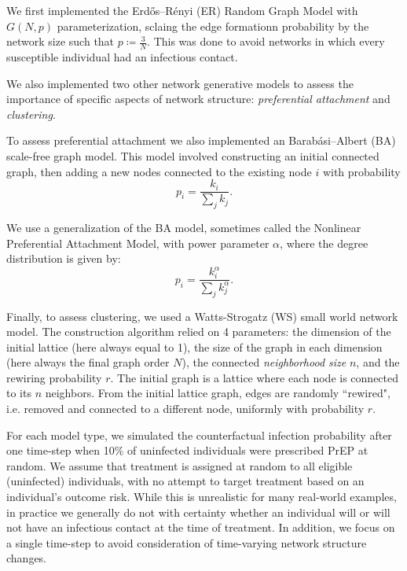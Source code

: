\documentclass{article}
\theoremstyle{definition}
\begin{document}
We first implemented the  Erdős–Rényi (ER) Random Graph Model with $G(N,p)$ parameterization, sclaing the edge formationn probability by the network size such that $p \coloneqq \frac{3}{N}$. This was done to avoid networks in which every susceptible individual had an infectious contact. 

We also implemented two other network generative models to assess the importance of specific aspects of network structure: \textit{preferential attachment} and \textit{clustering}. 

To assess preferential attachment we also implemented an Barabási–Albert (BA) scale-free graph model. This model involved constructing an initial connected graph, then adding a new nodes connected to the existing node $i$ with probability 
\begin{equation*}
    p_{i}=\frac{k_{i}}{\sum_{j}k_{j}}.
\end{equation*}

We use a generalization of the BA model, sometimes called the Nonlinear Preferential Attachment Model, with power parameter $\alpha$, where the degree distribution is given by:
\begin{equation*}
    p_{i}=\frac{k_{i}^{\alpha}}{\sum_{j}k_{j}^{\alpha}}.
\end{equation*}

Finally, to assess clustering, we used a Watts-Strogatz (WS) small world network model. The construction algorithm relied on 4 parameters: the dimension of the initial lattice (here always equal to 1), the size of the graph in each dimension (here always the final graph order $N$), the connected \textit{neighborhood size} $n$, and the rewiring probability $r$. The initial graph is a lattice where each node is connected to its $n$ neighbors. From the initial lattice graph, edges are randomly ``rewired", i.e. removed and connected to a different node, uniformly with probability $r$.

For each model type, we simulated the counterfactual infection probability after one time-step when 10\% of uninfected individuals were prescribed PrEP at random. We assume that treatment is assigned at random to all eligible (uninfected) individuals, with no attempt to target treatment based on an individual's outcome risk. While this is unrealistic for many real-world examples, in practice we generally do not with certainty whether an individual will or will not have an infectious contact at the time of treatment. In addition, we focus on a single time-step to avoid consideration of time-varying network structure changes.
\end{document}
